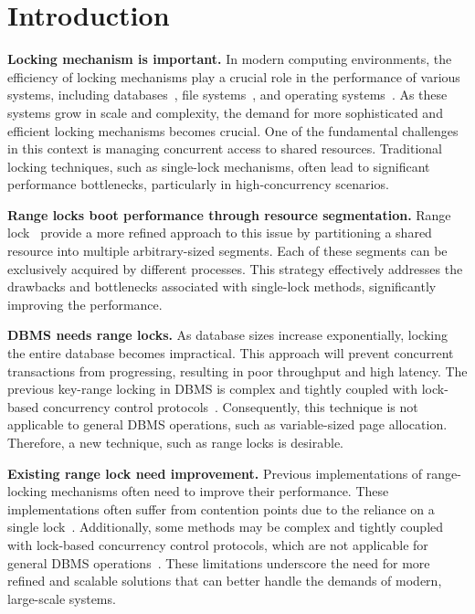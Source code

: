 
\chapter{Introduction}\label{chapter:introduction}

\textbf{Locking mechanism is important.}
In modern computing environments, the efficiency of locking mechanisms play a crucial role in the performance of various systems, including databases~\parencite{lomet1993key, graefe2007hierarchical}, file systems~\parencite{lee2021concurrent, gao2023citron, lee2019write}, and operating systems~\parencite{readerWriterLocks2017, mmapSem2017}. As these systems grow in scale and complexity, the demand for more sophisticated and efficient locking mechanisms becomes crucial. One of the fundamental challenges in this context is managing concurrent access to shared resources. Traditional locking techniques, such as single-lock mechanisms, often lead to significant performance bottlenecks, particularly in high-concurrency scenarios.

\textbf{Range locks boot performance through resource segmentation.} 
Range lock~\parencite{gao2023citron, kogan2020scalable} provide a more refined approach to this issue by partitioning a shared resource into multiple arbitrary-sized segments. Each of these segments can be exclusively acquired by different processes. This strategy effectively addresses the drawbacks and bottlenecks associated with single-lock methods, significantly improving the performance.

\textbf{DBMS needs range locks.}
As database sizes increase exponentially, locking the entire database becomes impractical. This approach will prevent concurrent transactions from progressing, resulting in poor throughput and high latency. The previous key-range locking in DBMS is complex and tightly coupled with lock-based concurrency control protocols~\parencite{graefe2007hierarchical, andy2022database}. 
Consequently, this technique is not applicable to general DBMS operations, such as variable-sized page allocation. Therefore, a new technique, such as range locks is desirable.

\textbf{Existing range lock need improvement.}
Previous implementations of range-locking mechanisms often need to improve their performance. These implementations often suffer from contention points due to the reliance on a single lock~\parencite{linuxRangeLockImpl2013, song2013parallelizing}. Additionally, some methods may be complex and tightly coupled with lock-based concurrency control protocols, which are not applicable for general DBMS operations~\parencite{graefe2007hierarchical, andy2022database}. These limitations underscore the need for more refined and scalable solutions that can better handle the demands of modern, large-scale systems.

